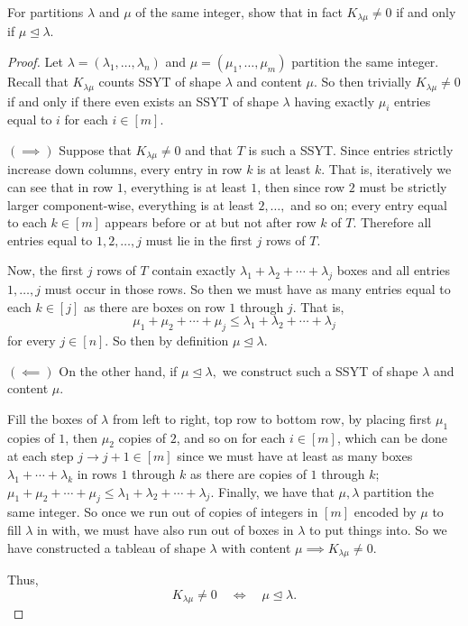 \documentclass[addpoints,10pt]{exam}
\theoremstyle{plain}
\theoremstyle{definition}
\newtheorem{prob}[thm]{Problem}
\theoremstyle{plain}
\theoremstyle{plain}
\theoremstyle{definition}
\let\oldprob\prob
\let\endoldprob\endprob
\renewenvironment{prob}
  {\begin{singlespace}\oldprob}
  {\endoldprob\end{singlespace}}
\begin{document}
\newpage
\setcounter{thm}{1}
\renewcommand{\thethm}{2.\arabic{thm}}

\begin{prob}
For partitions $\lambda$ and $\mu$ of the same integer, show that in fact $K_{\lambda\mu}\neq 0$ if and only if $\mu\trianglelefteq \lambda.$
\end{prob}

\begin{proof}
Let $\lambda=(\lambda_{1},\hdots, \lambda_{n})$ and $\mu=(\mu_{1},\hdots, \mu_{m})$ partition the same integer. Recall that \(K_{\lambda\mu}\) counts SSYT of shape \(\lambda\) and content \(\mu\). So then trivially \(K_{\lambda\mu}\neq 0\) if and only if there even exists an SSYT of shape \(\lambda\) having exactly \(\mu_i\) entries equal
to \(i\) for each $i\in [m]$. 

$(\implies)$ Suppose that \(K_{\lambda\mu}\neq 0\) and that \(T\) is such a SSYT. Since entries strictly increase down columns, every entry in row \(k\) is at least \(k\). That is, iteratively we can see that in row $1$, everything is at least $1$, then since row $2$ must be strictly larger component-wise, everything is at least $2,\hdots,$ and so on; every entry equal to each $k\in [m]$ appears before or at but not after row $k$ of $T$. Therefore all entries equal to \(1,2,\ldots,j\) must lie in the first \(j\) rows of $T$.

Now, the first \(j\) rows of \(T\) contain exactly $\lambda_1+\lambda_2+\cdots+\lambda_j$
boxes and all entries \(1,\ldots,j\) must occur in those rows. So then we must have as many entries equal to each $k\in [j]$ as there are boxes on row $1$ through $j$. That is,
\[
\mu_1+\mu_2+\cdots+\mu_j
\leq
\lambda_1+\lambda_2+\cdots+\lambda_j
\]
for every \(j\in [n]\). So then by definition
$\mu\trianglelefteq \lambda.$

$(\impliedby)$ On the other hand, if $\mu\trianglelefteq \lambda,$ we construct such a SSYT of shape $\lambda$ and content $\mu$.

Fill the boxes of \(\lambda\) from left to right, top row to bottom row, by placing first \(\mu_1\) copies of \(1\), then \(\mu_2\) copies of \(2\), and so on for each $i\in [m]$, which can be done at each step $j\to j+1\in [m]$ since we must have at least as many boxes $\lambda_{1}+\cdots +\lambda_{k}$ in rows $1$ through $k$ as there are copies of $1$ through $k$; $\mu_1+\mu_2+\cdots+\mu_j \leq
\lambda_1+\lambda_2+\cdots+\lambda_j$. Finally, we have that $\mu,\lambda$ partition the same integer. So once we run out of copies of integers in $[m]$ encoded by $\mu$ to fill $\lambda$ in with, we must have also run out of boxes in $\lambda$ to put things into. So we have constructed a tableau of shape $\lambda$ with content $\mu\implies K_{\lambda\mu}\neq 0$. 

Thus,
\[
K_{\lambda\mu}\neq 0
\quad\Longleftrightarrow\quad
\mu\trianglelefteq \lambda.
\]
\end{proof}
\end{document}
